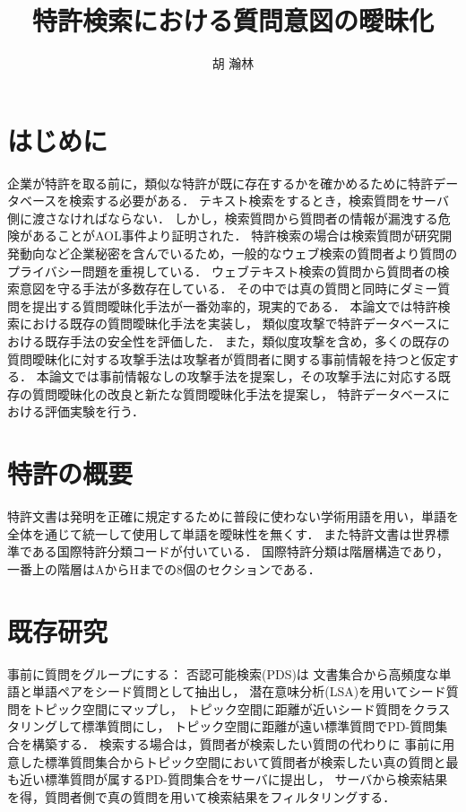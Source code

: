 \documentclass[papersize]{suribtabst}
\title{特許検索における質問意図の曖昧化}
\author{胡 瀚林}
\begin{document}
\maketitle

\section{はじめに} %
企業が特許を取る前に，類似な特許が既に存在するかを確かめるために特許データベースを検索する必要がある．
テキスト検索をするとき，検索質問をサーバ側に渡さなければならない．
しかし，検索質問から質問者の情報が漏洩する危険があることがAOL事件\cite{AOL}より証明された．
特許検索の場合は検索質問が研究開発動向など企業秘密を含んでいるため，一般的なウェブ検索の質問者より質問のプライバシー問題を重視している．
ウェブテキスト検索の質問から質問者の検索意図を守る手法が多数存在している．
その中では真の質問と同時にダミー質問を提出する質問曖昧化手法が一番効率的，現実的である．
本論文では特許検索における既存の質問曖昧化手法\cite{providing2009,embellishing2010,masking2014}を実装し，
類似度攻撃\cite{simattack2016}で特許データベースにおける既存手法の安全性を評価した．
また，類似度攻撃を含め，多くの既存の質問曖昧化に対する攻撃手法は攻撃者が質問者に関する事前情報を持つと仮定する．
本論文では事前情報なしの攻撃手法を提案し，その攻撃手法に対応する既存の質問曖昧化の改良と新たな質問曖昧化手法を提案し，
特許データベースにおける評価実験を行う．

\section{特許の概要}
特許文書は発明を正確に規定するために普段に使わない学術用語を用い，単語を全体を通じて統一して使用して単語を曖昧性を無くす．
また特許文書は世界標準である国際特許分類コードが付いている．
国際特許分類は階層構造であり，一番上の階層はAからHまでの8個のセクションである．

\section{既存研究}
事前に質問をグループにする：
否認可能検索(PDS)は
文書集合から高頻度な単語と単語ペアをシード質問として抽出し，
潜在意味分析(LSA)\cite{LSA1990}を用いてシード質問をトピック空間にマップし，
トピック空間に距離が近いシード質問をクラスタリングして標準質問にし，
トピック空間に距離が遠い標準質問でPD-質問集合を構築する．
検索する場合は，質問者が検索したい質問の代わりに
事前に用意した標準質問集合からトピック空間において質問者が検索したい真の質問と最も近い標準質問が属するPD-質問集合をサーバに提出し，
サーバから検索結果を得，質問者側で真の質問を用いて検索結果をフィルタリングする．
\end{document}
